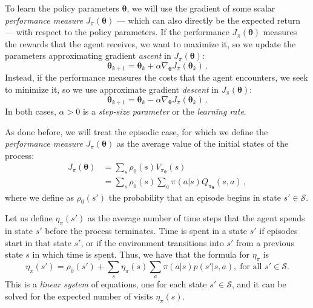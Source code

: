To learn the policy parameters $\boldsymbol \theta$, we will use the gradient of some scalar \emph{performance measure} $J_\pi(\boldsymbol \theta)$ --- which can also directly be the expected return --- with respect to the policy parameters. If the performance $J_\pi(\boldsymbol \theta)$ measures the rewards that the agent receives, we want to maximize it, so we update the parameters approximating gradient \textit{ascent} in $J_\pi(\boldsymbol \theta)$:
\begin{equation}
    \boldsymbol \theta_{k+1} = \boldsymbol \theta_k + \alpha \nabla_{\boldsymbol \theta} J_\pi(\boldsymbol \theta_k) \, .
    \label{eq:grad-ascent}
\end{equation}
Instead, if the performance measures the costs that the agent encounters, we seek to minimize it, so we use approximate gradient \textit{descent} in $J_\pi(\boldsymbol \theta)$:
\begin{equation}
    \boldsymbol \theta_{k+1} = \boldsymbol \theta_k - \alpha \nabla_{\boldsymbol \theta} J_\pi(\boldsymbol \theta_k) \, .
    \label{eq:grad-descent}
\end{equation}
In both cases, $\alpha > 0$ is a \emph{step-size parameter} or the \emph{learning rate}.

As done before, we will treat the episodic case, for which we define the \emph{performance measure} $J_\pi(\boldsymbol \theta)$ as the average value of the initial states of the process:
\begin{equation}
    \begin{aligned}
        J_\pi (\boldsymbol \theta) 
        &= \sum_s \rho_0(s) V_{\pi_{\boldsymbol \theta}}(s) \\
        &= \sum_s \rho_0(s) \sum_a \pi(a|s) Q_{\pi_{\boldsymbol \theta}}(s, a) \, ,
    \end{aligned}
    \label{eq:J}
\end{equation}
where we define as $\rho_0(s')$ the probability that an episode begins in state $s' \in \mathcal S$.

Let us define $\eta_\pi(s')$ as the average number of time steps that the agent spends in state $s'$ before the process terminates. Time is spent in a state $s'$ if episodes start in that state $s'$, or if the environment transitions into $s'$ from a previous state $s$ in which time is spent. Thus, we have that the formula for $\eta_\pi$ is
\begin{equation}
    \eta_\pi(s') = \rho_0(s') + \sum_s \eta_\pi(s) \sum_a \pi(a|s) p(s'|s, a), \; \text{for all } s' \in \mathcal S.
    \label{eq:eta}
\end{equation}
This is a \textit{linear system} of equations, one for each state $s' \in \mathcal S$, and it can be solved for the expected number of visits $\eta_\pi(s)$.

